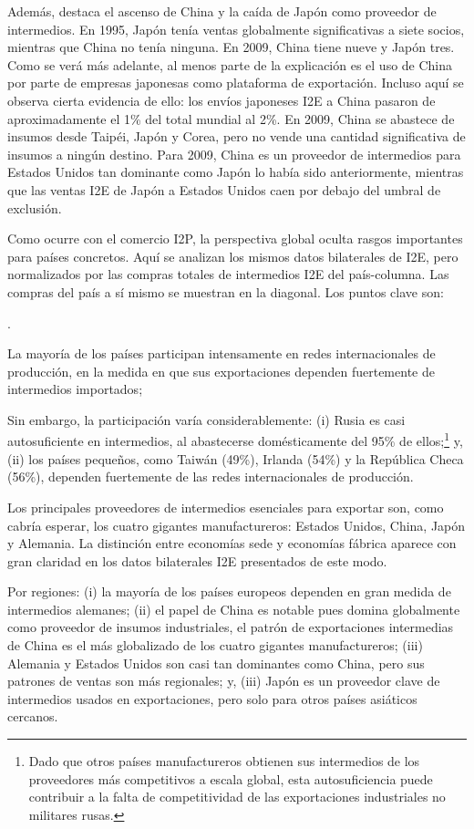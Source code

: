 \documentclass[10pt,a4paper]{article}
\newcounter{numitem}
\newenvironment{lnum}
      {\begin{list}{\arabic{numitem}.}{%
          \usecounter{numitem}%
          \setlength{\leftmargin}{1cm}%
          \setlength{\parskip}{3pt}%
          \setlength{\itemsep}{0pt}%
          \setlength{\parsep}{0pt}%
      }}
      {\end{list}}
\begin{document}
Además, destaca el ascenso de China y la caída de Japón como proveedor de intermedios. En 1995, Japón tenía ventas globalmente significativas a siete socios, mientras que China no tenía ninguna. En 2009, China tiene nueve y Japón tres. Como se verá más adelante, al menos parte de la explicación es el uso de China por parte de empresas japonesas como plataforma de exportación. Incluso aquí se observa cierta evidencia de ello: los envíos japoneses I2E a China pasaron de aproximadamente el 1\% del total mundial al 2\%. En 2009, China se abastece de insumos desde Taipéi, Japón y Corea, pero no vende una cantidad significativa de insumos a ningún destino. Para 2009, China es un proveedor de intermedios para Estados Unidos tan dominante como Japón lo había sido anteriormente, mientras que las ventas I2E de Japón a Estados Unidos caen por debajo del umbral de exclusión.

Como ocurre con el comercio I2P, la perspectiva global oculta rasgos importantes para países concretos. Aquí se analizan los mismos datos bilaterales de I2E, pero normalizados por las compras totales de intermedios I2E del país-columna. Las compras del país a sí mismo se muestran en la diagonal. Los puntos clave son:
\begin{lnum}
    \item La mayoría de los países participan intensamente en redes internacionales de producción, en la medida en que sus exportaciones dependen fuertemente de intermedios importados;
    \item Sin embargo, la participación varía considerablemente: (i) Rusia es casi autosuficiente en intermedios, al abastecerse domésticamente del 95\% de ellos;\footnote{%
        Dado que otros países manufactureros obtienen sus intermedios de los proveedores más competitivos a escala global, esta autosuficiencia puede contribuir a la falta de competitividad de las exportaciones industriales no militares rusas.
    } y, (ii) los países pequeños, como Taiwán (49\%), Irlanda (54\%) y la República Checa (56\%), dependen fuertemente de las redes internacionales de producción. 
    \item Los principales proveedores de intermedios esenciales para exportar son, como cabría esperar, los cuatro gigantes manufactureros: Estados Unidos, China, Japón y Alemania. La distinción entre economías sede y economías fábrica aparece con gran claridad en los datos bilaterales I2E presentados de este modo.
\end{lnum}

Por regiones: (i) la mayoría de los países europeos dependen en gran medida de intermedios alemanes; (ii) el papel de China es notable pues domina globalmente como proveedor de insumos industriales, el patrón de exportaciones intermedias de China es el más globalizado de los cuatro gigantes manufactureros; (iii) Alemania y Estados Unidos son casi tan dominantes como China, pero sus patrones de ventas son más regionales; y, (iii) Japón es un proveedor clave de intermedios usados en exportaciones, pero solo para otros países asiáticos cercanos.
\end{document}
